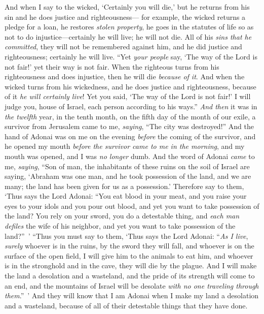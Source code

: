 \begin{biblechapter}
\verse And when I say to the wicked, ‘Certainly you will die,’ but he returns from his sin and he does justice and righteousness—
\verse for example, the wicked returns a pledge for a loan, he restores \textit{stolen property}, he goes in the statutes of life so as not to do injustice—certainly he will live; he will not die.
\verse All of his \textit{sins that he committed}, they will not be remembered against him, and he did justice and righteousness; certainly he will live.
\verse “Yet \textit{your people} say, ‘The way of the Lord is not fair!’ yet their way is not fair.
\verse When the righteous turns from his righteousness and does injustice, then he will die \textit{because of it}.
\verse And when the wicked turns from his wickedness, and he does justice and righteousness, because of it \textit{he will certainly live}!
\verse Yet you said, ‘The way of the Lord is not fair!’ I will judge you, house of Israel, each person according to his ways.”
\verse \textit{And then} it was in \textit{the twelfth} year, in the tenth month, on the fifth day of the month of our exile, a survivor from Jerusalem came to me, \textit{saying}, “The city was destroyed!”
\verse And the hand of Adonai was on me on the evening \textit{before} the coming of the survivor, and he opened my mouth \textit{before the survivor came to me in the morning}, and my mouth was opened, and I was \textit{no longer} dumb.
\verse And the word of Adonai \textit{came} to me, \textit{saying},
\verse “Son of man, the inhabitants of these ruins on the soil of Israel are saying, ‘Abraham was one man, and he took possession of the land, and we are many; the land has been given for us as a possession.’
\verse Therefore say to them, ‘Thus says the Lord Adonai: “You eat blood in your meat, and you raise your eyes to your idols and you pour out blood, and yet you want to take possession of the land?
\verse You rely on your sword, you do a detestable thing, and \textit{each man defiles} the wife of his neighbor, and yet you want to take possession of the land?” ’
\verse “Thus you must say to them, ‘Thus says the Lord Adonai: “\textit{As I live}, \textit{surely} whoever is in the ruins, by the sword they will fall, and whoever is on the surface of the open field, I will give him to the animals to eat him, and whoever is in the stronghold and in the cave, they will die by the plague.
\verse And I will make the land a desolation and a wasteland, and the pride of its strength will come to an end, and the mountains of Israel will be desolate \textit{with no one traveling through them}.” ’
\verse And they will know that I am Adonai when I make my land a desolation and a wasteland, because of all of their detestable things that they have done.

\end{biblechapter}
